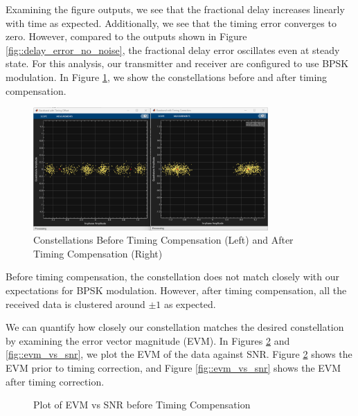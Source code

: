 \documentclass{article}
\begin{document}
\noindent Examining the figure outputs, we see that the fractional delay increases linearly with time as expected. Additionally, we see that the timing error converges to zero. However, compared to the outputs shown in Figure \ref{fig::delay_error_no_noise}, the fractional delay error oscillates even at steady state. For this analysis, our transmitter and receiver are configured to use BPSK modulation. In Figure \ref{fig::constellations_with_timing_correction}, we show the constellations before and after timing compensation.
 
\begin{figure}[H]
	\centerline{\includegraphics[width=0.8\textwidth]{constellations_with_timing_correction.png}}
	\caption{Constellations Before Timing Compensation (Left) and After Timing Compensation (Right)}
	\label{fig::constellations_with_timing_correction}
\end{figure}

\noindent Before timing compensation, the constellation does not match closely with our expectations for BPSK modulation. However, after timing compensation, all the received data is clustered around $\pm 1$ as expected.

We can quantify how closely our constellation matches the desired constellation by examining the error vector magnitude (EVM). In Figures \ref{fig::evm_vs_snr_no_correction} and \ref{fig::evm_vs_snr}, we plot the EVM of the data against SNR. Figure \ref{fig::evm_vs_snr_no_correction} shows the EVM prior to timing correction, and Figure \ref{fig::evm_vs_snr} shows the EVM after timing correction. 

\begin{figure}[H]
	\centerline{}
	\caption{Plot of EVM vs SNR before Timing Compensation}
	\label{fig::evm_vs_snr_no_correction}
\end{figure}
\end{document}
